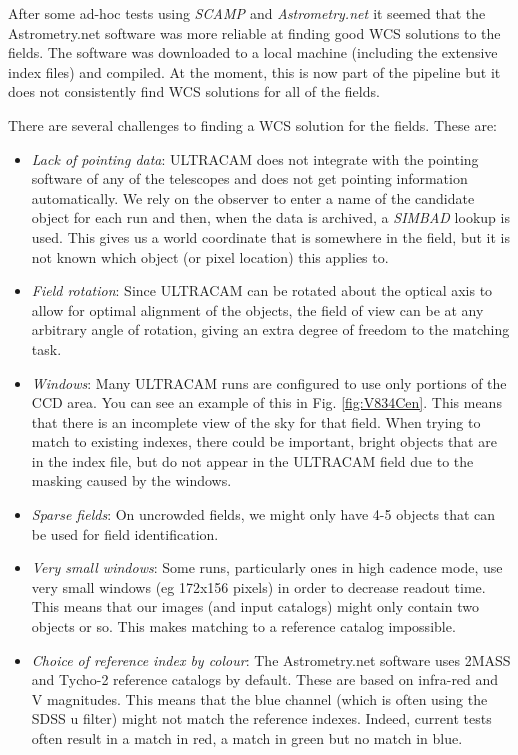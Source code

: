 After some ad-hoc tests using \emph{SCAMP \cite{scamp}} and \emph{Astrometry.net \cite{astrometry}} it seemed that the Astrometry.net software was more reliable at finding good WCS solutions to the fields. The software was downloaded to a local machine (including the extensive index files) and compiled. At the moment, this is now part of the pipeline but it does not consistently find WCS solutions for all of the fields. 

There are several challenges to finding a WCS solution for the fields.  These are:

\begin{itemize}
	\item \emph{Lack of pointing data}: ULTRACAM does not integrate with the pointing software of any of the telescopes and does not get pointing information automatically. We rely on the observer to enter a name of the candidate object for each run and then, when the data is archived, a \emph{SIMBAD} lookup is used. This gives us a world coordinate that is somewhere in the field, but it is not known which object (or pixel location) this applies to.  
	\item \emph{Field rotation}: Since ULTRACAM can be rotated about the optical axis to allow for optimal alignment of the objects, the field of view can be at any arbitrary angle of rotation, giving an extra degree of freedom to the matching task. 
	\item \emph{Windows}: Many ULTRACAM runs are configured to use only portions of the CCD area. You can see an example of this in Fig.  \ref{fig:V834Cen}. This means that there is an incomplete view of the sky for that field. When trying to match to existing indexes, there could be important, bright objects that are in the index file, but do not appear in the ULTRACAM field due to the masking caused by the windows.
	\item \emph{Sparse fields}: On uncrowded fields, we might only have 4-5 objects that can be used for field identification. 
	\item \emph{Very small windows}: Some runs, particularly ones in high cadence mode, use very small windows (eg 172x156 pixels) in order to decrease readout time. This means that our images (and input catalogs) might only contain two objects or so. This makes matching to a reference catalog impossible. 
	\item \emph{Choice of reference index by colour}: The Astrometry.net software uses 2MASS and Tycho-2 reference catalogs by default. These are based on infra-red and V magnitudes. This means that the blue channel (which is often using the SDSS u filter) might not match the reference indexes. Indeed, current tests often result in a match in red, a match in green but no match in blue. 
\end{itemize}

